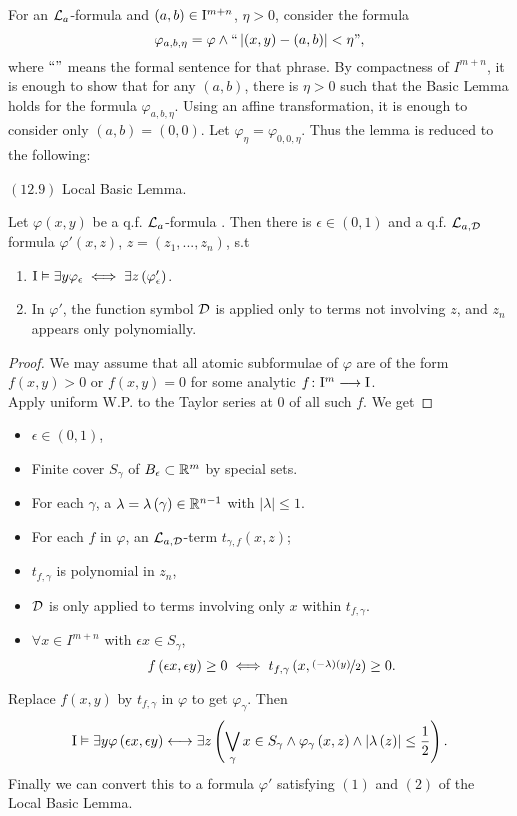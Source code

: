 For an $\mathcal{L}_{a}$-formula and $\left(a,b\right)\in\mathrm{I}^{m+n}$, $\eta>0$,
consider the formula 
\[
\varphi_{a,b,\eta}=\varphi\wedge``\left|\left(x,y\right)-\left(a,b\right)\right|<\eta",
\]
where $``"$ means the formal sentence for that phrase. By compactness
of $I^{m+n}$, it is enough to show that for any $\left(a,b\right)$,
there is $\eta>0$ such that the Basic Lemma holds for the formula
$\varphi_{a,b,\eta}$. Using an affine transformation, it is enough
to consider only $\left(a,b\right)=\left(0,0\right)$. Let $\varphi_{\eta}=\varphi_{0,0,\eta}$.
Thus the lemma is reduced to the following:
\begin{lem*}
$\left(12.9\right)$ Local Basic Lemma. 

Let $\varphi\left(x,y\right)$ be a q.f. $\mathcal{L}_{a}$-formula . Then
there is $\epsilon\in\left(0,1\right)$ and a q.f. $\mathcal{L}_{a,\mathcal{D}}$ formula
$\varphi'\left(x,z\right)$, $z=\left(z_{1},...,z_{n}\right)$, s.t 
\begin{enumerate}
\item $\mathrm{I}\vDash\exists y\varphi_{\epsilon}\iff\exists z\left(\varphi_{\epsilon}^{\prime}\right)$.
\item In $\varphi'$, the function symbol $\mathcal{D}$ is applied only to terms
not involving $z$, and $z_{n}$ appears only polynomially.
\end{enumerate}
\end{lem*}
\begin{proof}
We may assume that all atomic subformulae of $\varphi$ are of the
form $f\left(x,y\right)>0$ or $f\left(x,y\right)=0$ for some analytic
$f\colon\mathrm{I}^{m}\longrightarrow\mathrm{I}$.\\
Apply uniform W.P. to the Taylor series at $0$ of all such $f$.
We get \end{proof}
\begin{itemize}
\item $\epsilon\in\left(0,1\right)$,
\item Finite cover $S_{\gamma}$ of $B_{\epsilon}\subset\mathbb{R}^{m}$ by special
sets.
\item For each $\gamma$, a $\lambda=\lambda\left(\gamma\right)\in\mathbb{R}^{n-1}$
with $\left|\lambda\right|\leq1$.
\item For each $f$ in $\varphi$, an $\mathcal{L}_{a,\mathcal{D}}$-term $t_{\gamma,f}\left(x,z\right)$;
\item $t_{f,\gamma}$ is polynomial in $z_{n}$,
\item $\mathcal{D}$ is only applied to terms involving only $x$ within $t_{f,\gamma}$.
\item $\forall x\in I^{m+n}$ with $\epsilon x\in S_{\gamma}$,
\[
f\left(\epsilon x,\epsilon y\right)\geq0\iff t_{f,\gamma}\left(x,\nicefrac{\left(-\lambda\right)\left(y\right)}{2}\right)\geq0.
\]

\end{itemize}
Replace $f\left(x,y\right)$ by $t_{f,\gamma}$ in $\varphi$ to get
$\varphi_{\gamma}$. Then 
\[
\mathrm{I}\vDash\exists y\varphi\left(\epsilon x,\epsilon y\right)\longleftrightarrow\exists z\left(\bigvee_{\gamma}x\in S_{\gamma}\wedge\varphi_{\gamma}\left(x,z\right)\wedge\left|\lambda\left(z\right)\right|\leq\frac{1}{2}\right).
\]
Finally we can convert this to a formula $\varphi'$ satisfying $\left(1\right)$
and $\left(2\right)$ of the Local Basic Lemma.